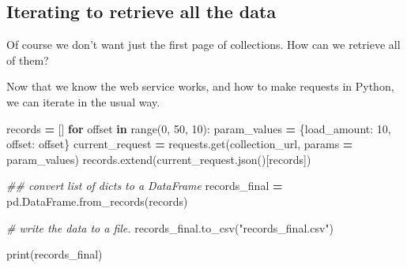 \documentclass[
]{book}
\newenvironment{Shaded}{\begin{snugshade}}{\end{snugshade}}
\newcommand{\BuiltInTok}[1]{#1}
\newcommand{\CommentTok}[1]{\textcolor[rgb]{0.56,0.35,0.01}{\textit{#1}}}
\newcommand{\ControlFlowTok}[1]{\textcolor[rgb]{0.13,0.29,0.53}{\textbf{#1}}}
\newcommand{\DecValTok}[1]{\textcolor[rgb]{0.00,0.00,0.81}{#1}}
\newcommand{\KeywordTok}[1]{\textcolor[rgb]{0.13,0.29,0.53}{\textbf{#1}}}
\newcommand{\NormalTok}[1]{#1}
\newcommand{\OperatorTok}[1]{\textcolor[rgb]{0.81,0.36,0.00}{\textbf{#1}}}
\newcommand{\StringTok}[1]{\textcolor[rgb]{0.31,0.60,0.02}{#1}}
\begin{document}
\hypertarget{iterating-to-retrieve-all-the-data}{%
\subsection{Iterating to retrieve all the data}\label{iterating-to-retrieve-all-the-data}}

Of course we don't want just the first page of collections. How can we retrieve all of them?

Now that we know the web service works, and how to make requests in Python, we can iterate in the usual way.

\begin{Shaded}
\begin{Highlighting}[]
\NormalTok{records }\OperatorTok{=}\NormalTok{ []}
\ControlFlowTok{for}\NormalTok{ offset }\KeywordTok{in} \BuiltInTok{range}\NormalTok{(}\DecValTok{0}\NormalTok{, }\DecValTok{50}\NormalTok{, }\DecValTok{10}\NormalTok{):}
\NormalTok{    param\_values }\OperatorTok{=}\NormalTok{ \{}\StringTok{\textquotesingle{}load\_amount\textquotesingle{}}\NormalTok{: }\DecValTok{10}\NormalTok{, }\StringTok{\textquotesingle{}offset\textquotesingle{}}\NormalTok{: offset\}}
\NormalTok{    current\_request }\OperatorTok{=}\NormalTok{ requests.get(collection\_url, params }\OperatorTok{=}\NormalTok{ param\_values)}
\NormalTok{    records.extend(current\_request.json()[}\StringTok{\textquotesingle{}records\textquotesingle{}}\NormalTok{])}
\end{Highlighting}
\end{Shaded}

\begin{Shaded}
\begin{Highlighting}[]
\CommentTok{\#\# convert list of dicts to a \textasciigrave{}DataFrame\textasciigrave{}}
\NormalTok{records\_final }\OperatorTok{=}\NormalTok{ pd.DataFrame.from\_records(records)}
\end{Highlighting}
\end{Shaded}

\begin{Shaded}
\begin{Highlighting}[]
\CommentTok{\# write the data to a file.}
\NormalTok{records\_final.to\_csv(}\StringTok{"records\_final.csv"}\NormalTok{)}
\end{Highlighting}
\end{Shaded}

\begin{Shaded}
\begin{Highlighting}[]
\BuiltInTok{print}\NormalTok{(records\_final)}
\end{Highlighting}
\end{Shaded}
\end{document}
